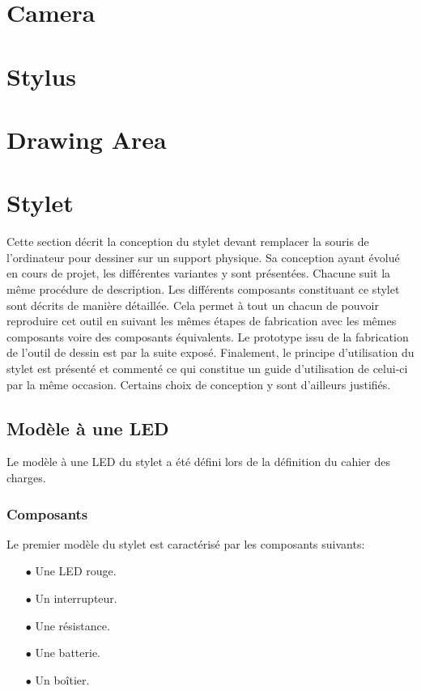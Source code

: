 \documentclass[11pt,a4paper,oldfontcommands]{memoir}
\begin{document}
\section{Camera}

\section{Stylus}

\section{Drawing Area}

\section{Stylet}

Cette section décrit la conception du stylet devant remplacer la souris de l'ordinateur pour dessiner sur un support physique. Sa conception ayant évolué en cours de projet, les différentes variantes y sont présentées. Chacune suit la même procédure de description. Les différents composants constituant ce stylet sont décrits de manière détaillée. Cela permet à tout un chacun de pouvoir reproduire cet outil en suivant les mêmes étapes de fabrication avec les mêmes composants voire des composants équivalents. Le prototype issu de la fabrication de l'outil de dessin est par la suite exposé. Finalement, le principe d'utilisation du stylet est présenté et commenté ce qui constitue un guide d'utilisation de celui-ci par la même occasion. Certains choix de conception y sont d'ailleurs justifiés.

\subsection{Modèle à une LED}

Le modèle à une LED du stylet a été défini lors de la définition du cahier des charges.

\subsubsection{Composants}

Le premier modèle du stylet est caractérisé par les composants suivants:

\begin{itemize}
\item[$\bullet$] Une LED rouge.
\item[$\bullet$] Un interrupteur.
\item[$\bullet$] Une résistance.
\item[$\bullet$] Une batterie.
\item[$\bullet$] Un boîtier.
\end{itemize}
\end{document}
